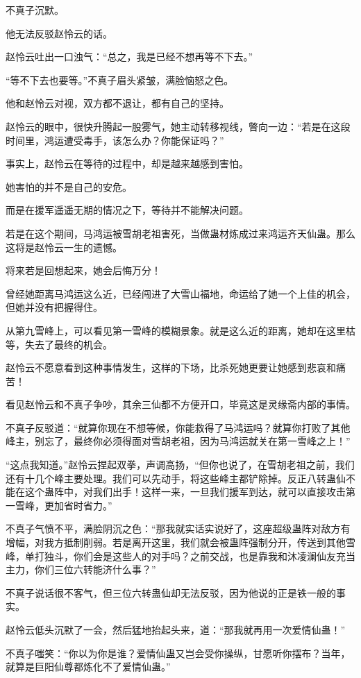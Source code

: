 \begin{this_body}
不真子沉默。

他无法反驳赵怜云的话。

赵怜云吐出一口浊气：“总之，我是已经不想再等不下去。”

“等不下去也要等。”不真子眉头紧皱，满脸恼怒之色。

他和赵怜云对视，双方都不退让，都有自己的坚持。

赵怜云的眼中，很快升腾起一股雾气，她主动转移视线，瞥向一边：“若是在这段时间里，鸿运遭受毒手，该怎么办？你能保证吗？”

事实上，赵怜云在等待的过程中，却是越来越感到害怕。

她害怕的并不是自己的安危。

而是在援军遥遥无期的情况之下，等待并不能解决问题。

若是在这个期间，马鸿运被雪胡老祖害死，当做蛊材炼成过来鸿运齐天仙蛊。那么这将是赵怜云一生的遗憾。

将来若是回想起来，她会后悔万分！

曾经她距离马鸿运这么近，已经闯进了大雪山福地，命运给了她一个上佳的机会，但她并没有把握得住。

从第九雪峰上，可以看见第一雪峰的模糊景象。就是这么近的距离，她却在这里枯等，失去了最终的机会。

赵怜云不愿意看到这种事情发生，这样的下场，比杀死她更要让她感到悲哀和痛苦！

看见赵怜云和不真子争吵，其余三仙都不方便开口，毕竟这是灵缘斋内部的事情。

不真子反驳道：“就算你现在不想等候，你能救得了马鸿运吗？就算你打败了其他峰主，别忘了，最终你必须得面对雪胡老祖，因为马鸿运就关在第一雪峰之上！”

“这点我知道。”赵怜云捏起双拳，声调高扬，“但你也说了，在雪胡老祖之前，我们还有十几个峰主要处理。我们可以先动手，将这些峰主都铲除掉。反正八转蛊仙不能在这个蛊阵中，对我们出手！这样一来，一旦我们援军到达，就可以直接攻击第一雪峰，更加省时省力。”

不真子气愤不平，满脸阴沉之色：“那我就实话实说好了，这座超级蛊阵对敌方有增幅，对我方抵制削弱。若是离开这里，我们就会被蛊阵强制分开，传送到其他雪峰，单打独斗，你们会是这些人的对手吗？之前交战，也是靠我和沐凌澜仙友充当主力，你们三位六转能济什么事？”

不真子说话很不客气，但三位六转蛊仙却无法反驳，因为他说的正是铁一般的事实。

赵怜云低头沉默了一会，然后猛地抬起头来，道：“那我就再用一次爱情仙蛊！”

不真子嗤笑：“你以为你是谁？爱情仙蛊又岂会受你操纵，甘愿听你摆布？当年，就算是巨阳仙尊都炼化不了爱情仙蛊。”


\end{this_body}
